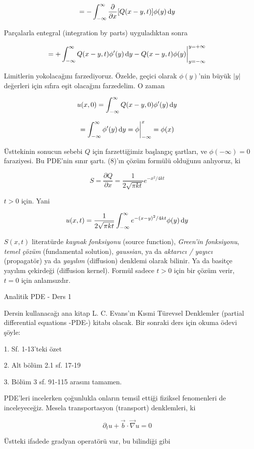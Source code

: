 \documentclass[12pt,fleqn]{article}\usepackage{../../common}
\begin{document}
$$ = -\int _{-\infty}^{\infty} 
\frac{\partial }{\partial x}[Q(x-y,t)]\phi(y)\,\mathrm{d} y
  $$

Parçalarla entegral (integration by parts) uyguladıktan sonra 

$$ 
=  + \int _{-\infty}^{\infty}  Q(x-y,t)\phi'(y)\,\mathrm{d} y - 
Q(x-y,t)\phi(y) \bigg| _{y=-\infty}^{y=+\infty}
$$

Limitlerin yokolacağını farzediyoruz. Özelde, geçici olarak $\phi(y)$'nin
büyük $|y|$ değerleri için sıfıra eşit olacağını farzedelim. O zaman 

$$ u(x,0) = 
\int _{-\infty}^{\infty} Q(x-y, 0) \phi'(y)\,\mathrm{d} y 
 $$

$$ 
= \int _{-\infty}^{\infty} \phi'(y)\,\mathrm{d} y = \phi \bigg| _{-\infty}^{x} = \phi(x)
$$

Üsttekinin sonucun sebebi $Q$ için farzettiğimiz başlangıç şartları, ve
$\phi(-\infty) = 0$ faraziyesi. Bu PDE'nin sınır şartı. (8)'ın çözüm
formülü olduğunu anlıyoruz, ki 

$$ S = \frac{\partial Q}{\partial x} = \frac{ 1}{2\sqrt{\pi kt}} 
e^{ -x^2 / 4kt}
$$

$t>0$ için. Yani 

$$
u(x,t) =  \frac{ 1}{2\sqrt{\pi kt}} 
\int _{-\infty}^{\infty} e^{-(x-y)^2 / 4kt} \phi(y) \,\mathrm{d} y
$$

$S(x,t)$ literatürde {\em kaynak fonksiyonu} (source function), {\em Green'in
fonksiyonu}, {\em temel çözüm} (fundamental solution), {\em gaussian}, ya
da {\em aktarıcı / yayıcı} (propagatör) ya da {\em yayılım} (diffusion) denklemi
olarak bilinir. Ya da basitçe yayılım çekirdeği (diffusion kernel). Formül
sadece $t>0$ için bir çözüm verir, $t=0$ için anlamsızdır. 


Analitik PDE - Ders 1

Dersin kullanacağı ana kitap L. C. Evans'ın Kısmi Türevsel Denklemler
(partial differential equations -PDE-) kitabı olacak. Bir sonraki ders için
okuma ödevi şöyle:

1. Sf. 1-13'teki özet

2. Alt bölüm 2.1 sf. 17-19

3. Bölüm 3 sf. 91-115 arasını tamamen. 

PDE'leri incelerken çoğunlukla onların temsil ettiği fiziksel fenomenleri
de inceleyeceğiz. Mesela transportasyon (transport) denklemleri, ki

$$ \partial_t u + \vec{b} \cdot \vec{\nabla} u = 0 $$

Üstteki ifadede gradyan operatörü var, bu bilindiği gibi
\end{document}
